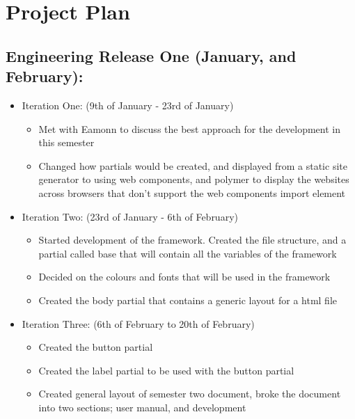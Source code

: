 \newpage
\section*{Project Plan}
\subsection*{Engineering Release One (January, and February):}
\begin{itemize}
	\item Iteration One: (9th of January - 23rd of January)\begin{itemize} 
	\item Met with Eamonn to discuss the best approach for the development in this semester
	\item Changed how partials would be created, and displayed from a static site generator to using web components, and polymer to display the websites across browsers that don't support the web components import element
	\end{itemize}
	\item Iteration Two: (23rd of January - 6th of February) \begin{itemize}
	\item Started development of the framework. Created the file structure, and a partial called base that will contain all the variables of the framework
	\item Decided on the colours and fonts that will be used in the framework
	\item Created the body partial that contains a generic layout for a html file
	\end{itemize}
	\item Iteration Three: (6th of February to 20th of February)\begin{itemize}
	\item Created the button partial
	\item Created the label partial to be used with the button partial
	\item Created general layout of semester two document, broke the document into two sections; user manual, and development
	\end{itemize}

\end{itemize}
